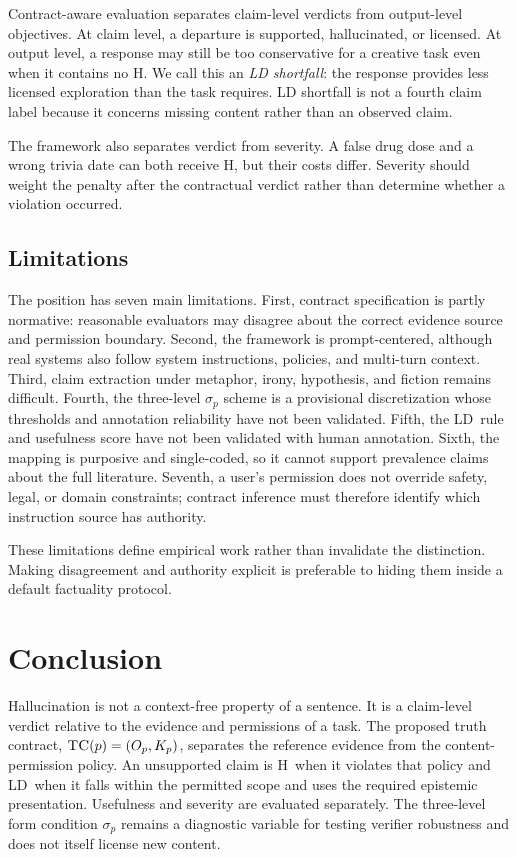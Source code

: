 \documentclass{clv2025}
\newcommand{\TC}{\textsc{TC}}
\newcommand{\LD}{\textsc{LD}}
\newcommand{\Hall}{\textsc{H}}
\begin{document}
Contract-aware evaluation separates claim-level verdicts from output-level objectives.
At claim level, a departure is supported, hallucinated, or licensed.
At output level, a response may still be too conservative for a creative task even when it contains no \Hall.
We call this an \emph{LD shortfall}: the response provides less licensed exploration than the task requires.
LD shortfall is not a fourth claim label because it concerns missing content rather than an observed claim.

The framework also separates verdict from severity.
A false drug dose and a wrong trivia date can both receive \Hall, but their costs differ.
Severity should weight the penalty after the contractual verdict rather than determine whether a violation occurred.

\subsection{Limitations}

The position has seven main limitations.
First, contract specification is partly normative: reasonable evaluators may disagree about the correct evidence source and permission boundary.
Second, the framework is prompt-centered, although real systems also follow system instructions, policies, and multi-turn context.
Third, claim extraction under metaphor, irony, hypothesis, and fiction remains difficult.
Fourth, the three-level $\sigma_p$ scheme is a provisional discretization whose thresholds and annotation reliability have not been validated.
Fifth, the \LD\ rule and usefulness score have not been validated with human annotation.
Sixth, the mapping is purposive and single-coded, so it cannot support prevalence claims about the full literature.
Seventh, a user's permission does not override safety, legal, or domain constraints; contract inference must therefore identify which instruction source has authority.

These limitations define empirical work rather than invalidate the distinction.
Making disagreement and authority explicit is preferable to hiding them inside a default factuality protocol.

\section{Conclusion}\label{sec:conclusion}

Hallucination is not a context-free property of a sentence.
It is a claim-level verdict relative to the evidence and permissions of a task.
The proposed truth contract, $\TC(p)=(O_p,K_p)$, separates the reference evidence from the content-permission policy.
An unsupported claim is \Hall\ when it violates that policy and \LD\ when it falls within the permitted scope and uses the required epistemic presentation.
Usefulness and severity are evaluated separately.
The three-level form condition $\sigma_p$ remains a diagnostic variable for testing verifier robustness and does not itself license new content.
\end{document}
